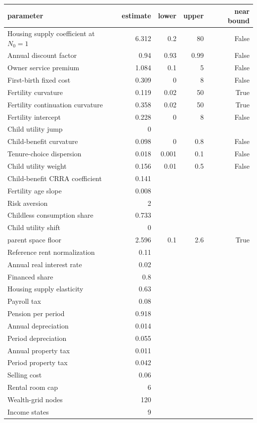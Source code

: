 \begin{tabular}{lrrrr}
\toprule
parameter & estimate & lower & upper & near bound \\
\midrule
Housing supply coefficient at $N_0=1$ & 6.312 & 0.2 & 80 & False \\
Annual discount factor & 0.94 & 0.93 & 0.99 & False \\
Owner service premium & 1.084 & 0.1 & 5 & False \\
First-birth fixed cost & 0.309 & 0 & 8 & False \\
Fertility curvature & 0.119 & 0.02 & 50 & True \\
Fertility continuation curvature & 0.358 & 0.02 & 50 & True \\
Fertility intercept & 0.228 & 0 & 8 & False \\
Child utility jump & 0 &  &  &  \\
Child-benefit curvature & 0.098 & 0 & 0.8 & False \\
Tenure-choice dispersion & 0.018 & 0.001 & 0.1 & False \\
Child utility weight & 0.156 & 0.01 & 0.5 & False \\
Child-benefit CRRA coefficient & 0.141 &  &  &  \\
Fertility age slope & 0.008 &  &  &  \\
Risk aversion & 2 &  &  &  \\
Childless consumption share & 0.733 &  &  &  \\
Child utility shift & 0 &  &  &  \\
parent space floor & 2.596 & 0.1 & 2.6 & True \\
Reference rent normalization & 0.11 &  &  &  \\
Annual real interest rate & 0.02 &  &  &  \\
Financed share & 0.8 &  &  &  \\
Housing supply elasticity & 0.63 &  &  &  \\
Payroll tax & 0.08 &  &  &  \\
Pension per period & 0.918 &  &  &  \\
Annual depreciation & 0.014 &  &  &  \\
Period depreciation & 0.055 &  &  &  \\
Annual property tax & 0.011 &  &  &  \\
Period property tax & 0.042 &  &  &  \\
Selling cost & 0.06 &  &  &  \\
Rental room cap & 6 &  &  &  \\
Wealth-grid nodes & 120 &  &  &  \\
Income states & 9 &  &  &  \\
\bottomrule
\end{tabular}
